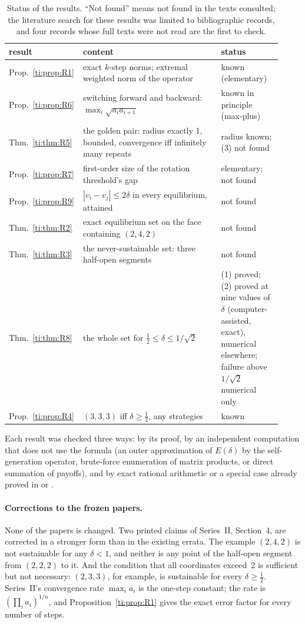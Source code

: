 \documentclass[11pt]{amsart}
\theoremstyle{remark}
\begin{document}
\begin{table}[ht]\centering\small
\begin{tabular}{@{}p{0.2\linewidth}p{0.5\linewidth}p{0.22\linewidth}@{}}
\toprule
result & content & status \\
\midrule
Prop.~\ref{ti:prop:R1} & exact $k$-step norms; extremal weighted norm of the operator & known (elementary) \\
Prop.~\ref{ti:prop:R6} & switching forward and backward: $\max_i\sqrt{a_ia_{i+1}}$ & known in principle (max-plus) \\
Thm.~\ref{ti:thm:R5} & the golden pair: radius exactly 1, bounded, convergence iff infinitely many repeats & radius known; (3) not found \\
Prop.~\ref{ti:prop:R7} & first-order size of the rotation threshold's gap & elementary; not found \\
Prop.~\ref{ti:prop:R9} & $|v_i-v_j|\le2\delta$ in every equilibrium, attained & not found \\
Thm.~\ref{ti:thm:R2} & exact equilibrium set on the face containing $(2,4,2)$ & not found \\
Thm.~\ref{ti:thm:R3} & the never-sustainable set: three half-open segments & not found \\
Thm.~\ref{ti:thm:R8} & the whole set for $\frac12\le\delta\le1/\sqrt2$ & (1) proved; (2) proved at nine values of $\delta$ (computer-assisted, exact), numerical elsewhere; failure above $1/\sqrt2$ numerical only \\
Prop.~\ref{ti:prop:R4} & $(3,3,3)$ iff $\delta\ge\frac12$, any strategies & known \\
\bottomrule
\end{tabular}
\caption{Status of the results. ``Not found'' means not found in the texts consulted; the
literature search for these results was limited to bibliographic records, and four records whose
full texts were not read are the first to check.}
\label{ti:tab:status}
\end{table}

Each result was checked three ways: by its proof, by an independent computation that does not use
the formula (an outer approximation of $E(\delta)$ by the self-generation operator, brute-force
enumeration of matrix products, or direct summation of payoffs), and by exact rational arithmetic or
a special case already proved in \cite{v1} or \cite{note}.

\paragraph{Corrections to the frozen papers.} None of the papers is changed. Two printed claims of
Series~II, Section~4, are corrected in a stronger form than in the existing errata. The example
$(2,4,2)$ is not sustainable for any $\delta<1$, and neither is any point of the half-open segment
from $(2,2,2)$ to it. And the condition that all coordinates exceed~2 is sufficient but not
necessary: $(2,3,3)$, for example, is sustainable for every $\delta\ge\frac12$. Series~II's
convergence rate $\max_i a_i$ is the one-step constant; the rate is $(\prod_ia_i)^{1/n}$, and
Proposition~\ref{ti:prop:R1} gives the exact error factor for every number of steps.
\end{document}
